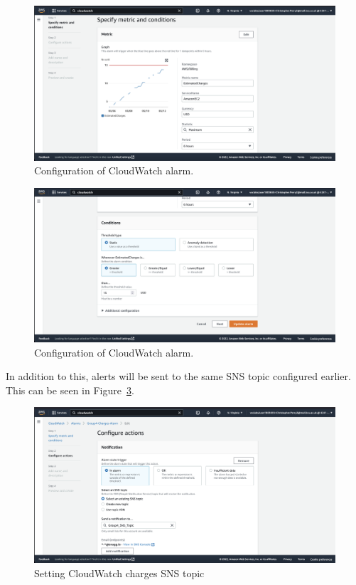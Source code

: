 \begin{figure}[!htbp]
    \centering
    \includegraphics[width=\textwidth]{resources/cloudwatch/cloudwatch-charges-config-1}
    \caption{Configuration of CloudWatch alarm.}
    \label{fig:cloudwatch-charges-config-1}
\end{figure}

\begin{figure}[!htbp]
    \centering
    \includegraphics[width=\textwidth]{resources/cloudwatch/cloudwatch-charges-config-2}
    \caption{Configuration of CloudWatch alarm.}
    \label{fig:cloudwatch-charges-config-2}
\end{figure}

\clearpage
In addition to this, alerts will be sent to the same SNS topic configured earlier.
This can be seen in Figure~\ref{fig:cloudwatch-charges-sns}.

\begin{figure}[!htbp]
    \centering
    \includegraphics[width=\textwidth]{resources/cloudwatch/cloudwatch-charges-sns}
    \caption{Setting CloudWatch charges SNS topic}
    \label{fig:cloudwatch-charges-sns}
\end{figure}

